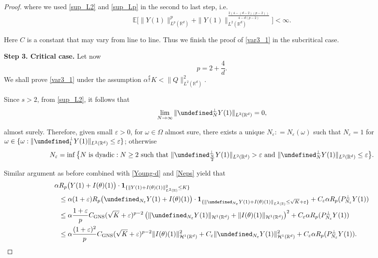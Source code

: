 \documentclass[%
11pt,  reqno]{amsart}
\theoremstyle{remarkstyle}
\newcommand{\1}{\hspace{0.2mm}\text{I}\hspace{0.2mm}}
\newcommand{\noi}{\noindent}
\newcommand{\R}{\mathbb{R}}
\let\P= \undefined
\newcommand{\P}{\mathbf{P}}
\newcommand{\E}{\mathbb{E}}
\newcommand{\al}{\alpha}
\newcommand{\eps}{\varepsilon}
\renewcommand{\o}{\omega}
\renewcommand{\O}{\Omega}
\newcommand{\ind}{\mathbf 1}
\renewcommand{\H}{\mathcal{H}}
\numberwithin{equation}{section}
\numberwithin{theorem}{section}
\begin{document}
\begin{proof}
		\noi
		where we used \eqref{sup_L2} and \eqref{sup_Lp} in the second to last step, i.e.
		\[
		\E \Big[    \|Y(1)\|_{L^p(\R^d)}^p  + \| Y(1)\|_{L^2 (\R^d)}^{\frac{2(4-(d-2)(p-2))}{4-d(p-2)}} \Big] < \infty.
		\]
		
		\noi 
		Here $C$ is a constant that may vary from line to line. 
		Thus we finish the proof of \eqref{var3_1} in the subcritical case.
		
		\medskip
		
		\noi
		{\bf Step 3. Critical case.} 
		Let now 
		$$
		p = 2+\frac4d.
		$$
		We shall prove \eqref{var3_1} under the assumption $\al^{\frac{d}2}K < \|Q\|^2_{L^2 (\R^d)}$.
		
		Since $s > 2$, from \eqref{sup_L2},
		it follows that
		\[
		\lim_{N \to \infty} \| \P^\perp_{N} Y(1) \|_{L^2 (\R^d)} = 0,
		\]
		
		\noi
		almost surely.  
		Therefore, given small $\eps >0$, 
		for $\o \in \O$ almost sure, 
		there exists a unique $N_\eps : = N_\eps(\o)$ such that  $N_\eps = 1$ for $\o \in \{\o: \| \P^\perp_{1} Y(1) \|_{L^2 (\R^d)} \le \eps\}$; otherwise 
		\begin{align}
			\label{Neps}
			N_\eps = \inf \big\{N \textup{ is dyadic}: N \ge 2 \textup{ such that }\| \P^\perp_{\frac{N}2} Y(1) \|_{L^2 (\R^d)} > \eps  \textup{ and }  
			\| \P^\perp_{N} Y(1) \|_{L^2 (\R^d)} \le \eps \big\}.
		\end{align}
		
		\noi
		Similar argument as before combined with \eqref{Young-d} and \eqref{Neps} yield that
		\begin{align}
			\al &R_p \big(Y(1) +I(\theta)(1)\big) 
			\cdot  \ind_{\{\|Y(1) +I(\theta)(1)\|^2_{L^2(\R)}\le K\}} \label{var5a} \\
			& \le \al (1+ \eps) R_p \big( \P_{ N_\eps} Y(1) + I(\theta)(1)\big) 
			\cdot  \ind_{\{\|\P_{N_\eps} Y(1) + I(\theta)(1)\|_{L^2(\R)}\le \sqrt{K}+\eps \}}   + C_\eps \al R_p(P_{N_\eps}^\perp Y(1)) \nonumber\\
			& \le \al \frac{1+\eps}p C_{\textup{GNS}} (\sqrt{K}+\eps)^{p-2} \left( \| \P_{N_\eps} Y(1)\|_{\H^1 (\R^d)}  + \| I(\theta)(1)\|_{\H^1 (\R^d)} \right)^2 + C_\eps 
			\al R_p(P_{N_\eps}^\perp Y(1)) \nonumber\\
			& \le \al \frac{(1+\eps)^2}p C_{\textup{GNS}}  (\sqrt{K}+\eps)^{p-2}  \| I(\theta)(1)\|^{2}_{\H^1 (\R^d)} + C_\eps \| \P_{N_\eps} Y(1)\|^{2}_{\H^1 (\R^d)} + C_\eps \al R_p(P_{N_\eps}^\perp Y(1)). \nonumber
		\end{align}
		

\end{proof}
\end{document}
